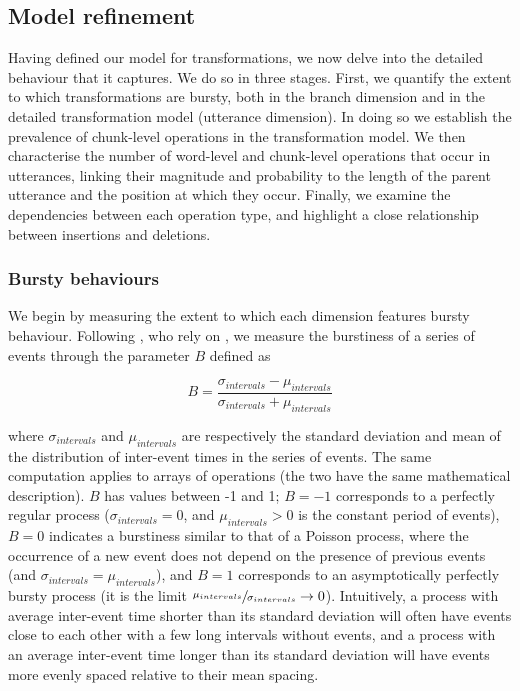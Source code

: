 \subsection{Model refinement}\label{sec:gistr-results-inner}

Having defined our model for transformations, we now delve into the
detailed behaviour that it captures. We do so in three stages. First, we
quantify the extent to which transformations are bursty, both in the
branch dimension and in the detailed transformation model (utterance
dimension). In doing so we establish the prevalence of chunk-level
operations in the transformation model. We then characterise the number
of word-level and chunk-level operations that occur in utterances,
linking their magnitude and probability to the length of the parent
utterance and the position at which they occur. Finally, we examine the
dependencies between each operation type, and highlight a close
relationship between insertions and deletions.

\subsubsection{Bursty behaviours}\label{bursty-behaviours}

We begin by measuring the extent to which each dimension features bursty
behaviour. Following \textcite{jo_circadian_2012}, who rely on
\textcite{goh_burstiness_2008}, we measure the burstiness of a series of
events through the parameter \(B\) defined as

\[B = \frac{\sigma_{intervals} - \mu_{intervals}}{\sigma_{intervals} + \mu_{intervals}}\]

where \(\sigma_{intervals}\) and \(\mu_{intervals}\) are respectively
the standard deviation and mean of the distribution of inter-event times
in the series of events. The same computation applies to arrays of
operations (the two have the same mathematical description). \(B\) has
values between -1 and 1; \(B = -1\) corresponds to a perfectly regular
process (\(\sigma_{intervals} = 0\), and \(\mu_{intervals} > 0\) is the
constant period of events), \(B = 0\) indicates a burstiness similar to
that of a Poisson process, where the occurrence of a new event does not
depend on the presence of previous events (and
\(\sigma_{intervals} = \mu_{intervals}\)), and \(B = 1\) corresponds to
an asymptotically perfectly bursty process (it is the limit
\(\sfrac{\mu_{intervals}}{\sigma_{intervals}} \rightarrow 0\)).
Intuitively, a process with average inter-event time shorter than its
standard deviation will often have events close to each other with a few
long intervals without events, and a process with an average inter-event
time longer than its standard deviation will have events more evenly
spaced relative to their mean spacing.

